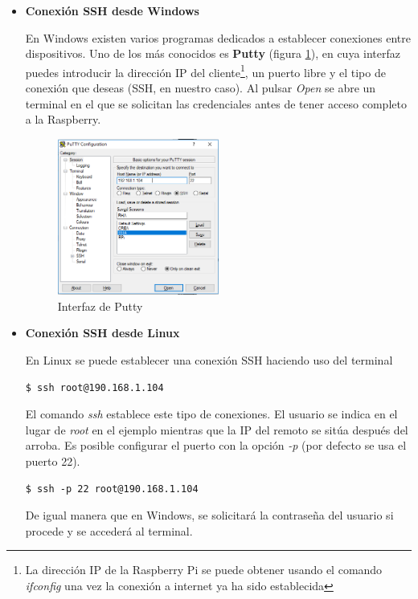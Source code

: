 \begin{itemize}
\item \textbf{Conexión SSH desde Windows}

En Windows existen varios programas dedicados a establecer conexiones entre dispositivos. Uno de los más conocidos es \textbf{Putty} (figura \ref{fig:putty}), en cuya interfaz puedes introducir la dirección IP del cliente\footnote{La dirección IP de la Raspberry Pi se puede obtener usando el comando \textit{ifconfig} una vez la conexión a internet ya ha sido establecida}, un puerto libre y el tipo de conexión que deseas (SSH, en nuestro caso). Al pulsar \textit{Open} se abre un terminal en el que se solicitan las credenciales antes de tener acceso completo a la Raspberry.

\begin{figure}[H]
\centering
\includegraphics[width=0.5\textwidth]{figuras/Putty.png}
\caption{Interfaz de Putty}
\label{fig:putty}
\end{figure}

\item \textbf{Conexión SSH desde Linux}

En Linux se puede establecer una conexión SSH haciendo uso del terminal

\begin{lstlisting}[frame=single, label=command:ssh]
$ ssh root@190.168.1.104
\end{lstlisting}

El comando \textit{ssh} establece este tipo de conexiones. El usuario se indica en el lugar de \textit{root} en el ejemplo mientras que la IP del remoto se sitúa después del arroba. Es posible configurar el puerto con la opción \textit{-p} (por defecto se usa el puerto 22).

\begin{lstlisting}[frame=single, label=command:ssh-p]
$ ssh -p 22 root@190.168.1.104
\end{lstlisting}

De igual manera que en Windows, se solicitará la contraseña del usuario si procede y se accederá al terminal.

\end{itemize}

